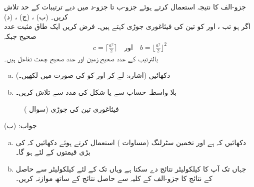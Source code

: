 جزو-الف کا نتیجہ استعمال کرتے ہوئے جزو-ب تا جزو-د میں دیے ترتیبات کے حد تلاش کریں۔ (ب) ، (ج) ، (د) 
\\
اگر  ہو تب ،  اور  کو تین کی فیثاغوری جوڑی کہتے ہیں۔ فرض کریں  ایک طاق مثبت عدد صحیح  جبکہ
\begin{align*}
c=\lceil\tfrac{a^2}{2}\rceil\quad \text{اور}\quad b=\lfloor\tfrac{a^2}{2}\rfloor^2
\end{align*}
بالترتیب  کے عدد صحیح زمین اور عدد صحیح چھت تفاعل ہیں۔
\begin{enumerate}[a.]
\item
دکھائیں  (اشارہ:   لے کر  اور  کو  کی صورت میں لکھیں۔)
\item
بلا واسطہ حساب سے یا شکل  کی مدد سے  تلاش کریں۔
\end{enumerate}
\begin{figure}
\centering
{}
\caption{فیثاغوری تین کی جوڑی (سوال )}
\label{شکل_سوال_ترکیب_فیثاغورث_جوڑی}
\end{figure}
جواب:\quad
(ب) 
\\
\begin{enumerate}[a.]
\item
دکھائیں کہ  ہے اور  تخمین سٹرلنگ (مساوات ) استعمال کرتے ہوئے دکھائیں کہ  کی بڑی قیمتوں کے لئے   ہو گا۔
\item
جہاں تک آپ کا کیلکولیٹر نتائج دے سکتا ہے وہاں تک  کے لئے کیلکولیٹر سے حاصل  کے نتائج کا جزو-الف کے کلیہ سے حاصل نتائج کے ساتھ موازنہ کریں۔ 
\end{enumerate}
